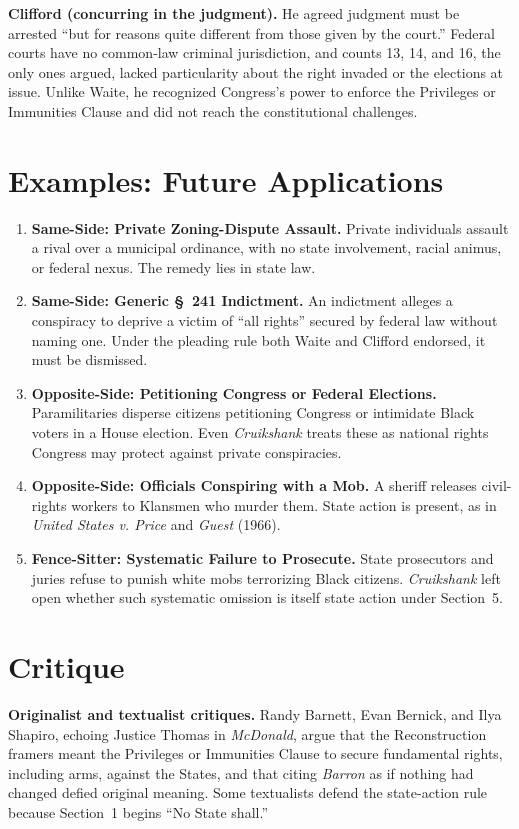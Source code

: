 \documentclass[12pt]{article}
\begin{document}
\textbf{Clifford (concurring in the judgment).} He agreed judgment must be arrested ``but for reasons quite different from those given by the court.'' Federal courts have no common-law criminal jurisdiction, and counts 13, 14, and 16, the only ones argued, lacked particularity about the right invaded or the elections at issue. Unlike Waite, he recognized Congress's power to enforce the Privileges or Immunities Clause and did not reach the constitutional challenges.

\section{Examples: Future Applications}

\begin{enumerate}
\item \textbf{Same-Side: Private Zoning-Dispute Assault.} Private individuals assault a rival over a municipal ordinance, with no state involvement, racial animus, or federal nexus. The remedy lies in state law.
\item \textbf{Same-Side: Generic \S~241 Indictment.} An indictment alleges a conspiracy to deprive a victim of ``all rights'' secured by federal law without naming one. Under the pleading rule both Waite and Clifford endorsed, it must be dismissed.
\item \textbf{Opposite-Side: Petitioning Congress or Federal Elections.} Paramilitaries disperse citizens petitioning Congress or intimidate Black voters in a House election. Even \textit{Cruikshank} treats these as national rights Congress may protect against private conspiracies.
\item \textbf{Opposite-Side: Officials Conspiring with a Mob.} A sheriff releases civil-rights workers to Klansmen who murder them. State action is present, as in \textit{United States v. Price} and \textit{Guest} (1966).
\item \textbf{Fence-Sitter: Systematic Failure to Prosecute.} State prosecutors and juries refuse to punish white mobs terrorizing Black citizens. \textit{Cruikshank} left open whether such systematic omission is itself state action under Section~5.
\end{enumerate}

\section{Critique}

\textbf{Originalist and textualist critiques.} Randy Barnett, Evan Bernick, and Ilya Shapiro, echoing Justice Thomas in \textit{McDonald}, argue that the Reconstruction framers meant the Privileges or Immunities Clause to secure fundamental rights, including arms, against the States, and that citing \textit{Barron} as if nothing had changed defied original meaning. Some textualists defend the state-action rule because Section~1 begins ``No State shall.''
\end{document}
